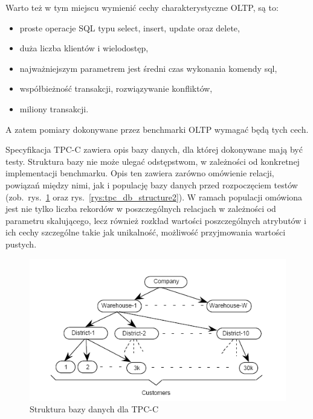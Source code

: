 Warto też w tym miejscu wymienić cechy charakterystyczne OLTP, są to:
\begin{itemize}
\item proste operacje SQL typu select, insert, update oraz delete,
\item duża liczba klientów i wielodostęp,
\item najważniejszym parametrem jest średni czas wykonania komendy sql,
\item współbieżność transakcji, rozwiązywanie konfliktów,
\item miliony transakcji.
\end{itemize}
A zatem pomiary dokonywane przez benchmarki OLTP wymagać będą tych cech.

Specyfikacja TPC-C zawiera opis bazy danych, dla której dokonywane mają być testy. Struktura
bazy nie może ulegać odstępstwom, w zależności od konkretnej implementacji benchmarku.
Opis ten zawiera zarówno omówienie relacji, powiązań między nimi, jak i populację bazy danych
przed rozpoczęciem testów (zob.~rys.~\ref{rys:tpc_db_structure} oraz rys.~\vref{rys:tpc_db_structure2}). 
W ramach populacji omówiona jest nie tylko liczba rekordów w poszczególnych relacjach 
w zależności od parametru skalującego, lecz również rozkład wartości 
poszczególnych atrybutów i ich cechy szczególne takie jak unikalność, możliwość
przyjmowania wartości pustych.

\begin{figure}[p]
\begin{center}
\includegraphics[width=\linewidth]{figures/tpc/tpc_db_structure.png}
\end{center}
\caption{Struktura bazy danych dla TPC-C~\cite{TPC1}}\label{rys:tpc_db_structure}
\end{figure}

